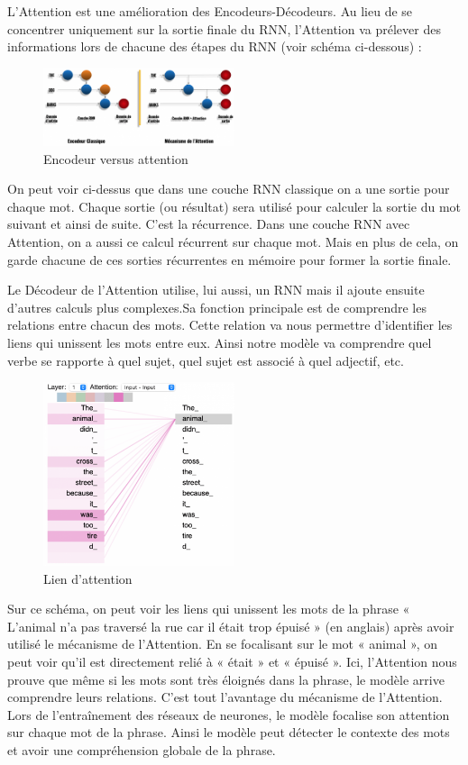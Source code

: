 \documentclass[8pt]{article}
\begin{document}
L'Attention est une amélioration des Encodeurs-Décodeurs. Au lieu de se
concentrer uniquement sur la sortie finale du RNN, l'Attention va
prélever des informations lors de chacune des étapes du RNN (voir schéma
ci-dessous) :
\begin{figure}
\centering
\includegraphics[width=0.5\textwidth]{EncoderVSAttention-1024x417.png}
\caption{Encodeur versus attention}
\end{figure}
On peut voir ci-dessus que dans une couche RNN classique on a une sortie
pour chaque mot. Chaque sortie (ou résultat) sera utilisé pour calculer
la sortie du mot suivant et ainsi de suite. C'est la récurrence. Dans
une couche RNN avec Attention, on a aussi ce calcul récurrent sur chaque
mot. Mais en plus de cela, on garde chacune de ces sorties récurrentes
en mémoire pour former la sortie finale.

Le Décodeur de l'Attention utilise, lui aussi, un RNN mais il ajoute
ensuite d'autres calculs plus complexes.Sa fonction principale est de
comprendre les relations entre chacun des mots. Cette relation va nous
permettre d'identifier les liens qui unissent les mots entre eux. Ainsi
notre modèle va comprendre quel verbe se rapporte à quel sujet, quel
sujet est associé à quel adjectif, etc.

\begin{figure}
\centering
\includegraphics[width=0.5\textwidth]{AttentionViz-768x738.png}
\caption{Lien d'attention}
\end{figure}


Sur ce schéma, on peut voir les liens qui unissent les mots de la phrase
« L'animal n'a pas traversé la rue car il était trop épuisé » (en
anglais) après avoir utilisé le mécanisme de l'Attention. En se
focalisant sur le mot « animal », on peut voir qu'il est directement
relié à « était » et « épuisé ». Ici, l'Attention nous prouve que même
si les mots sont très éloignés dans la phrase, le modèle arrive
comprendre leurs relations. C'est tout l'avantage du mécanisme de
l'Attention. Lors de l'entraînement des réseaux de neurones, le modèle
focalise son attention sur chaque mot de la phrase. Ainsi le modèle peut
détecter le contexte des mots et avoir une compréhension globale de la
phrase.
\end{document}
